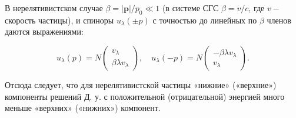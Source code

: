 \documentclass[10pt]{article}
\begin{document}
В нерелятивистском случае $\beta=|\boldsymbol{p}| / p_{0} \ll 1$ (в системе СГС $\beta=v / c$, где $v-$ скорость частицы), и спиноры $u_{\lambda}( \pm p)$ с точностью до линейных по $\beta$ членов даются выражениями:



\[

u_{\lambda}(p)=N\left(\begin{array}{c}

v_{\lambda} \\

\beta \lambda v_{\lambda}

\end{array}\right), \quad u_{\lambda}(-p)=N\left(\begin{array}{c}

-\beta \lambda v_{\lambda} \\

v_{\lambda}

\end{array}\right) .

\]



Отсюда следует, что для нерелятивистской частицы «нижние» («верхние») компоненты решений Д. у. с положительной (отрицательной) энергией много меньше «верхних» («нижних») компонент.
\end{document}
